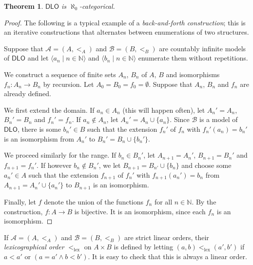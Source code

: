 \documentclass[a4paper, 11pt]{amsart}
\newtheorem{theorem}{Theorem}[subsection]
\theoremstyle{remark}
\newcommand{\cB}{\mathcal B}
\newcommand{\cA}{\mathcal A}
\newcommand{\DLO}{\mathsf{DLO}}
\newcommand{\lex}{\mathrm{lex}}
\begin{document}
\begin{theorem} \label{DLO is aleph0-categorical} 
$\DLO$ is $\aleph_0$-categorical. 
\end{theorem} 
\begin{proof} 
The following is a typical example of a \emph{back-and-forth construction}; this is an iterative constructions that alternates between enumerations of  two structures. 

Suppose that $\cA=(A,<_A)$ and $\cB=(B,<_B)$ are countably infinite models of $\DLO$ and let $\langle a_n\mid n\in\mathbb{N}\rangle$ and $\langle b_n\mid n\in\mathbb{N}\rangle$ enumerate them without repetitions. 

We construct a sequence of finite sets $A_n$, $B_n$ of $A$, $B$ and isomorphisms $f_n\colon A_n\rightarrow B_n$ by recursion. 
Let $A_0=B_0=f_0=\emptyset$. 
Suppose that $A_n$, $B_n$ and $f_n$ are already defined. 

We first extend the domain. 
If $a_n\in A_n$ (this will happen often), let $A_n'=A_n$, $B_n'=B_n$ and  $f_n'=f_n$. 
If $a_n\notin A_n$, let $A_n'=A_n\cup\{a_n\}$.
Since $\cB$ is a model of $\DLO$, there is some $b_n'\in B$ such that the extension $f_n'$ of $f_n$ with $f_n'(a_n)=b_n'$ is an isomorphism from $A_n'$ to $B_n'=B_n\cup\{b_n'\}$. 

We proceed similarly for the range. 
If $b_n\in B_n'$, let $A_{n+1}=A_n'$, $B_{n+1}=B_n'$ and  $f_{n+1}=f_n'$. If however $b_n\notin B_n'$, we let $B_{n+1}=B_{n'}\cup\{b_n\}$ and choose some $a_n'\in A$ such that the extension $f_{n+1}$ of $f_n'$ with $f_{n+1}(a_n')=b_n$ from $A_{n+1}=A_n'\cup\{a_n'\}$ to $B_{n+1}$ is an isomorphism. 

Finally, let $f$ denote the union of the functions $f_n$ for all $n\in\mathbb{N}$. By the construction, $f\colon A\rightarrow B$ is bijective. 
It is an isomorphism, since each $f_n$ is an isomorphism. 
\end{proof} 

If $\cA=(A,<_A)$ and $\cB=(B,<_B)$ are strict linear orders, their \emph{lexicographical order} $<_\lex$ on $A\times B$ is defined by letting $(a,b)<_\lex(a',b')$ if $a<a'$ or $(a=a' \wedge b<b')$. It is easy to check that this is always a linear order. 
\end{document}
